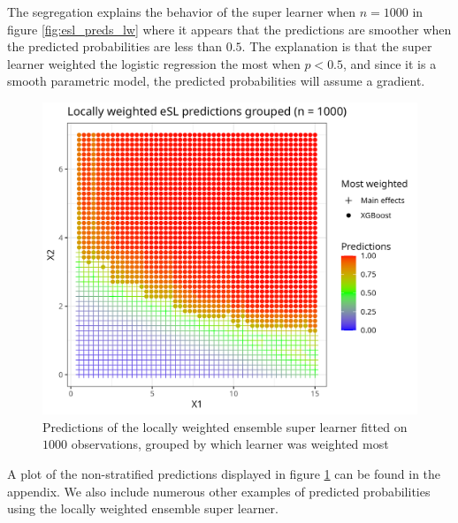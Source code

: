 \documentclass[./main.tex]{subfiles}
\begin{document}
The segregation explains the behavior of the super learner when $ n = 1000 $ in figure \ref{fig:esl_preds_lw} where it appears that the predictions are smoother when the predicted probabilities are less than $ 0.5 $. The explanation is that the super learner weighted the logistic regression the most when $ p < 0.5 $, and since it is a smooth parametric model, the predicted probabilities will assume a gradient. 
\begin{figure}[H]
    \centering
    \includegraphics[width=\textwidth]{figures/esl_preds_lw_stratified.png}
    \caption{Predictions of the locally weighted ensemble super learner fitted on $ 1000 $ observations, grouped by which learner was weighted most}
    \label{fig:esl_preds_lw_stratified}
\end{figure}
A plot of the non-stratified predictions displayed in figure \ref{fig:esl_preds_lw_stratified} can be found in the appendix. We also include numerous other examples of predicted probabilities using the locally weighted ensemble super learner.
\end{document}
